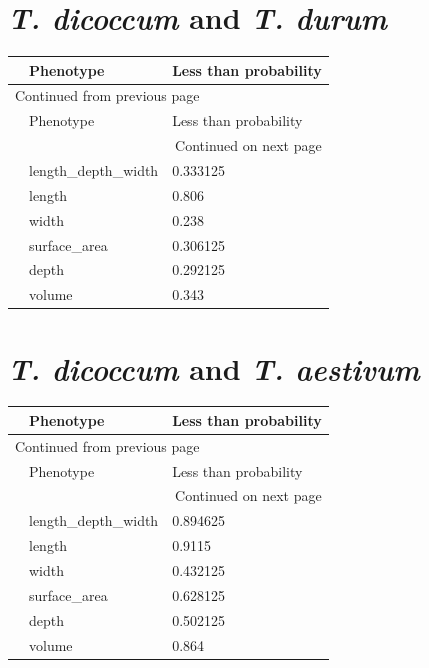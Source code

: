 \documentclass[11pt]{report}
\begin{document}
\section{\emph{T. dicoccum} and \emph{T. durum}}
\label{sec:org33906cc}
\begin{longtable}{l|l|l}
 & Phenotype & Less than probability\\
\hline
\endfirsthead
\multicolumn{3}{l}{Continued from previous page} \\
\hline

 & Phenotype & Less than probability \\

\hline
\endhead
\hline\multicolumn{3}{r}{Continued on next page} \\
\endfoot
\endlastfoot
\hline
 & length\_depth\_width & 0.333125\\
 & length & 0.806\\
 & width & 0.238\\
 & surface\_area & 0.306125\\
 & depth & 0.292125\\
 & volume & 0.343\\
\end{longtable}

\section{\emph{T. dicoccum} and \emph{T. aestivum}}
\label{sec:org784846b}
\begin{longtable}{l|l|l}
 & Phenotype & Less than probability\\
\hline
\endfirsthead
\multicolumn{3}{l}{Continued from previous page} \\
\hline

 & Phenotype & Less than probability \\

\hline
\endhead
\hline\multicolumn{3}{r}{Continued on next page} \\
\endfoot
\endlastfoot
\hline
 & length\_depth\_width & 0.894625\\
 & length & 0.9115\\
 & width & 0.432125\\
 & surface\_area & 0.628125\\
 & depth & 0.502125\\
 & volume & 0.864\\
\end{longtable}
\end{document}
